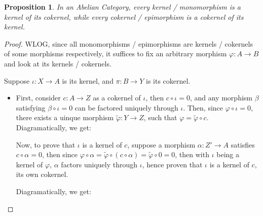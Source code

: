 \documentclass[x11names,reqno,12pt]{extarticle}
\newtheorem{prop}{Proposition}
\begin{document}
\begin{prop}
    In an Abelian Category, every kernel / monomorphism is a kernel of its cokernel, while every cokernel / epimorphism is a cokernel of its kernel.
\end{prop}
\begin{proof}
    WLOG, since all monomorphisms / epimorphisms are kernels / cokernels of some morphisms respectively, it suffices to fix an arbitrary morphism $\varphi:A\rightarrow B$ and look at its kernels / cokernels.

    Suppose $\iota:X\rightarrow A$ is its kernel, and $\pi:B\rightarrow Y$ is its cokernel. 
    \begin{itemize}
        \item First, consider $c:A\rightarrow Z$ as a cokernel of $\iota$, then $c\circ \iota = 0$, and any morphism $\beta$ satisfying $\beta\circ \iota = 0$ can be factored uniquely through $\iota$. Then, since $\varphi\circ \iota = 0$, there exists a uinque morphism $\tilde{\varphi}:Y \rightarrow Z$, such that $\varphi=\tilde{\varphi}\circ c$. Diagramatically, we get:
        \begin{center}
        \end{center}
        Now, to prove that $\iota$ is a kernel of $c$, suppose a morphism $\alpha:Z' \rightarrow A$ satisfies $c\circ \alpha = 0$, then since $\varphi\circ \alpha = \tilde{\varphi}\circ (c\circ\alpha) = \tilde{\varphi}\circ 0 = 0$, then with $\iota$ being a kernel of $\varphi$, $\alpha$ factors uniquely through $\iota$, hence proven that $\iota$ is a kernel of $c$, its own cokernel.

        Diagramatically, we get:
        \begin{center}
        \end{center}


\end{itemize}
\end{proof}
\end{document}
